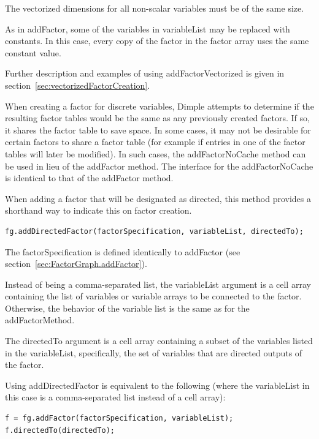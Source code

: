 The vectorized dimensions for all non-scalar variables must be of the same size.

As in addFactor, some of the variables in variableList may be replaced with constants.  In this case, every copy of the factor in the factor array uses the same constant value.

Further description and examples of using addFactorVectorized is given in section~\ref{sec:vectorizedFactorCreation}.
\fi

\ifmatlab
{}
\label{sec:addFactorNoCache}

When creating a factor for discrete variables, Dimple attempts to determine if the resulting factor tables would be the same as any previously created factors.  If so, it shares the factor table to save space.  In some cases, it may not be desirable for certain factors to share a factor table (for example if entries in one of the factor tables will later be modified).  In such cases, the addFactorNoCache method can be used in lieu of the addFactor method.  The interface for the addFactorNoCache is identical to that of the addFactor method.

\fi

\ifmatlab
{}

When adding a factor that will be designated as directed, this method provides a shorthand way to indicate this on factor creation.

\begin{lstlisting}
fg.addDirectedFactor(factorSpecification, variableList, directedTo);
\end{lstlisting}

The factorSpecification is defined identically to addFactor (see section~\ref{sec:FactorGraph.addFactor}).

Instead of being a comma-separated list, the variableList argument is a cell array containing the list of variables or variable arrays to be connected to the factor.  Otherwise, the behavior of the variable list is the same as for the addFactorMethod.

The directedTo argument is a cell array containing a subset of the variables listed in the variableList, specifically, the set of variables that are directed outputs of the factor.

Using addDirectedFactor is equivalent to the following (where the variableList in this case is a comma-separated list instead of a cell array):

 \begin{lstlisting}
f = fg.addFactor(factorSpecification, variableList);
f.directedTo(directedTo);
\end{lstlisting}

